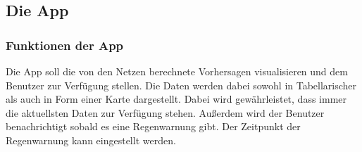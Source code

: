 \subsection{Die App}\label{die app}

\subsubsection{Funktionen der App}\label{funkionen der app}
Die App soll die von den Netzen berechnete Vorhersagen visualisieren und dem Benutzer zur Verfügung stellen. Die Daten werden dabei sowohl in 
Tabellarischer als auch in Form einer Karte dargestellt. Dabei wird gewährleistet, dass immer die aktuellsten Daten zur Verfügung stehen. 
Außerdem wird der Benutzer benachrichtigt sobald es eine Regenwarnung gibt. Der Zeitpunkt der Regenwarnung kann eingestellt werden.

